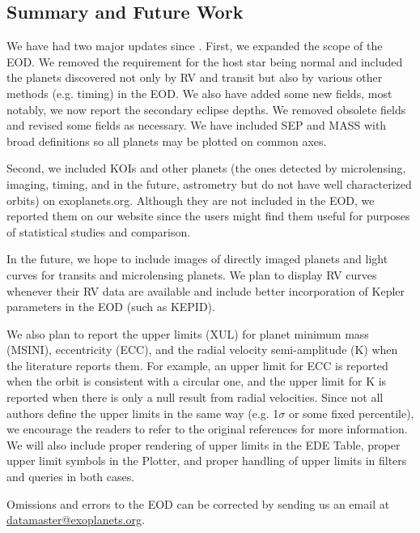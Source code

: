 \documentclass[11pt,preprint]{aastex}
\begin{document}
\begin{CJK*}{UTF8}{gbsn}
\section{Summary and Future Work}\label{sec:summary}

We have had two major updates since \cite{Wright2011}. First, we
expanded the scope of the EOD. We removed the requirement for the host
star being normal and included the planets discovered not only by RV
and transit but also by various other methods (e.g. timing) in the
EOD. We also have added some new fields, most notably, we now report
the secondary eclipse depths. We removed obsolete fields and revised
some fields as necessary. We have included SEP and MASS with broad definitions so all planets may be plotted on common axes.

Second, we included KOIs and other planets (the ones detected by
microlensing, imaging, timing, and in the future, astrometry but do not have well characterized orbits) on
exoplanets.org. Although they are not included in the EOD, we reported
them on our website since the users might find them useful for
purposes of statistical studies and comparison.

In the future, we hope to include images of directly imaged planets
and light curves for transits and
microlensing planets. We plan to display RV curves whenever their RV
data are available and include better incorporation of Kepler
parameters in the EOD (such as KEPID). 

We also plan to report the upper limits (XUL) for planet minimum mass (MSINI),
eccentricity (ECC), and the radial velocity semi-amplitude (K) when
the literature reports them. For example, an upper limit for ECC is
reported when the orbit is consistent with a circular one, and the
upper limit for K is reported when there is only a null result from
radial velocities. Since not all authors define the upper limits in the same
way (e.g. 1$\sigma$ or some fixed percentile), we encourage the
readers to refer to the original references for more information. We
will also include proper rendering of upper limits in the EDE Table,
proper upper limit symbols in the Plotter, and proper handling of
upper limits in filters and queries in both cases. 
 
Omissions and errors to the EOD can be corrected by sending us an
email at \url{datamaster@exoplanets.org}.


\acknowledgments


\end{CJK*}
\end{document}
